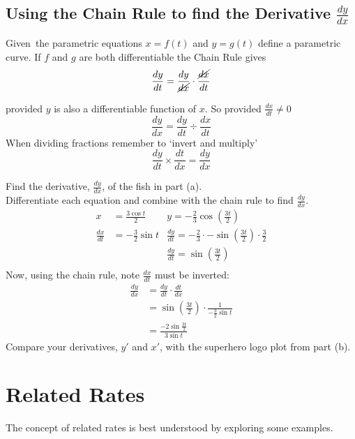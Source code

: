 \subsection*{Using the Chain Rule to find the Derivative $\frac{d y}{d x}$}
Given\ the parametric equations $x =f (t)$ and $y =g (t)$ define a parametric curve. If $f$ and $g$ are both differentiable the Chain Rule gives
\begin{equation*}\frac{d y}{d t} =\frac{d y}{\cancel{d x}} \cdot \frac{\cancel{d x}}{d t}
\end{equation*}

provided $y$ is also a differentiable function of $x$. So provided $\frac{d x}{d t} \neq 0$
\[\frac{d y}{d x} = \frac{d y}{d t} \div \frac{d x}{d t}\]
When dividing fractions remember to `invert and multiply'\\
\[\frac{d y}{d t} \times \frac{d t}{d x}=\frac{dy}{dx}\]

\example Find the derivative, $\frac{dy}{dx}$, of the fish in part (a).\medskip\\
\solution Differentiate each equation and combine with the chain rule to find $\frac{dy}{dx}$.\\
\begin{align*}x&=\frac{3\cos t}{2} &y=-\frac{2}{3}\cos\left({\frac{3t}{2}}\right)\\
\frac{dx}{dt}&=-\frac{3}{2}\sin t &\frac{dy}{dt}=-\frac{2}{3}\cdot-\sin \left({\frac{3t}{2}}\right)\cdot\frac{3}{2}\\
&&\frac{dy}{dt}=\sin \left({\frac{3t}{2}}\right)\\
\end{align*}
Now, using the chain rule, note $\frac{dx}{dt}$ must be inverted:\\
\begin{align*}\frac{dy}{dx}&=\frac{dy}{dt}\cdot\frac{dt}{dx}\\
&=\sin \left({\frac{3t}{2}}\right)\cdot \frac{1}{-\frac{3}{2}\sin t }\\
&=\frac{-2\sin \frac{3t}{2}}{3\sin t}
\end{align*}
Compare your derivatives, $y'$ and $x'$, with the superhero logo plot from part (b).
\section{Related Rates}
The concept of related rates is best understood by exploring some examples. 

